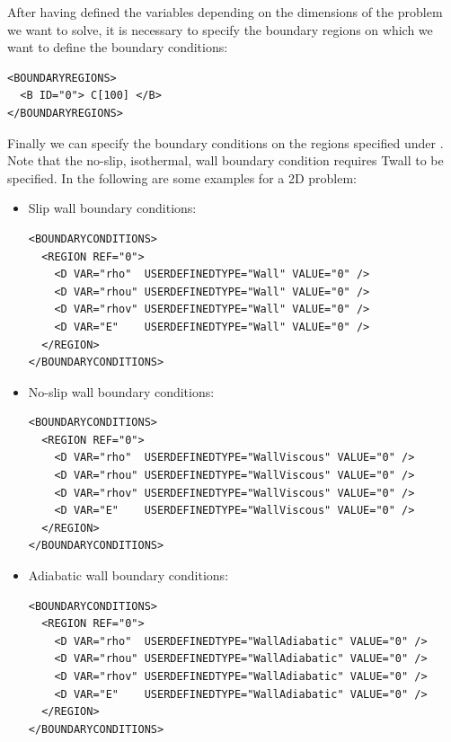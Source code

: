 After having defined the variables depending on the dimensions of the problem we want to solve,
it is necessary to specify the boundary regions on which we want to define the boundary conditions:
\begin{lstlisting}[style=XmlStyle]
<BOUNDARYREGIONS>
  <B ID="0"> C[100] </B>
</BOUNDARYREGIONS>
\end{lstlisting}

Finally we can specify the boundary conditions on the regions specified under .
Note that the no-slip, isothermal, wall boundary condition requires Twall to be specified.
In the following are some examples for a 2D problem:
\begin{itemize}
\item Slip wall boundary conditions:
\begin{lstlisting}[style=XmlStyle]
<BOUNDARYCONDITIONS>
  <REGION REF="0">
    <D VAR="rho"  USERDEFINEDTYPE="Wall" VALUE="0" />
    <D VAR="rhou" USERDEFINEDTYPE="Wall" VALUE="0" />
    <D VAR="rhov" USERDEFINEDTYPE="Wall" VALUE="0" />
    <D VAR="E"    USERDEFINEDTYPE="Wall" VALUE="0" />
  </REGION>
</BOUNDARYCONDITIONS>
\end{lstlisting}

\item No-slip wall boundary conditions:
\begin{lstlisting}[style=XmlStyle]
<BOUNDARYCONDITIONS>
  <REGION REF="0">
    <D VAR="rho"  USERDEFINEDTYPE="WallViscous" VALUE="0" />
    <D VAR="rhou" USERDEFINEDTYPE="WallViscous" VALUE="0" />
    <D VAR="rhov" USERDEFINEDTYPE="WallViscous" VALUE="0" />
    <D VAR="E"    USERDEFINEDTYPE="WallViscous" VALUE="0" />
  </REGION>
</BOUNDARYCONDITIONS>
\end{lstlisting}

\item Adiabatic wall boundary conditions:
\begin{lstlisting}[style=XmlStyle]
<BOUNDARYCONDITIONS>
  <REGION REF="0">
    <D VAR="rho"  USERDEFINEDTYPE="WallAdiabatic" VALUE="0" />
    <D VAR="rhou" USERDEFINEDTYPE="WallAdiabatic" VALUE="0" />
    <D VAR="rhov" USERDEFINEDTYPE="WallAdiabatic" VALUE="0" />
    <D VAR="E"    USERDEFINEDTYPE="WallAdiabatic" VALUE="0" />
  </REGION>
</BOUNDARYCONDITIONS>
\end{lstlisting}


\end{itemize}
